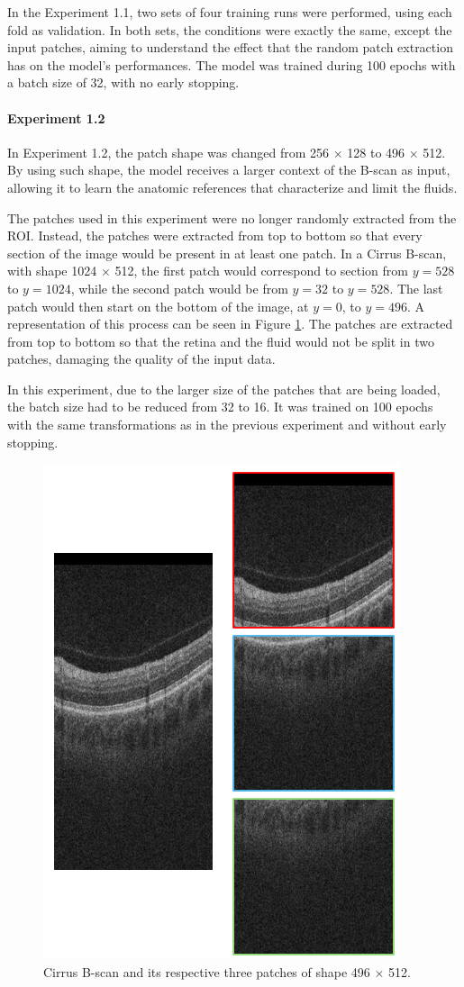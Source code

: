 \par
In the Experiment 1.1, two sets of four training runs were performed, using each fold as validation. In both sets, the conditions were exactly the same, except the input patches, aiming to understand the effect that the random patch extraction has on the model's performances. The model was trained during 100 epochs with a batch size of 32, with no early stopping.

\paragraph{Experiment 1.2}
In Experiment 1.2, the patch shape was changed from 256 $\times$ 128 to 496 $\times$ 512. By using such shape, the model receives a larger context of the B-scan as input, allowing it to learn the anatomic references that characterize and limit the fluids.
\par
The patches used in this experiment were no longer randomly extracted from the ROI. Instead, the patches were extracted from top to bottom so that every section of the image would be present in at least one patch. In a Cirrus B-scan, with shape 1024 $\times$ 512, the first patch would correspond to section from $y=528$ to $y=1024$, while the second patch would be from $y=32$ to $y=528$. The last patch would then start on the bottom of the image, at $y=0$, to $y=496$. A representation of this process can be seen in Figure \ref{fig:BigPatchExtraction}. The patches are extracted from top to bottom so that the retina and the fluid would not be split in two patches, damaging the quality of the input data.
\par
In this experiment, due to the larger size of the patches that are being loaded, the batch size had to be reduced from 32 to 16. It was trained on 100 epochs with the same transformations as in the previous experiment and without early stopping.

\begin{figure}[!ht]
	\centering
	\includegraphics[width=0.4\linewidth]{figures/BigPatchExtraction.png}
	\caption{Cirrus B-scan and its respective three patches of shape 496 $\times$ 512.}
	\label{fig:BigPatchExtraction}
\end{figure}

